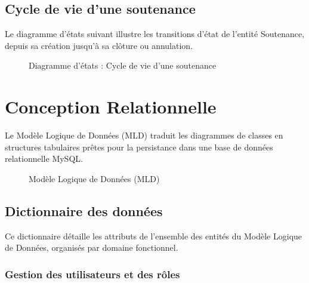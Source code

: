 \documentclass[12pt,a4paper]{article}
\begin{document}
\subsection{Cycle de vie d'une soutenance}

Le diagramme d'états suivant illustre les transitions d'état de l'entité Soutenance, depuis sa création jusqu'à sa clôture ou annulation.

\begin{figure}[H]
    \centering
    \caption{Diagramme d'états : Cycle de vie d'une soutenance}
\end{figure}

\newpage
\section{Conception Relationnelle}
\label{sec:relationnelle}

Le Modèle Logique de Données (MLD) traduit les diagrammes de classes en structures tabulaires prêtes pour la persistance dans une base de données relationnelle MySQL.

\begin{figure}[H]
    \centering
    \caption{Modèle Logique de Données (MLD)}
\end{figure}

\subsection{Dictionnaire des données}
\label{subsec:dictionnaire}

Ce dictionnaire détaille les attributs de l'ensemble des entités du Modèle Logique de Données, organisés par domaine fonctionnel.

\subsubsection{Gestion des utilisateurs et des rôles}
\end{document}
